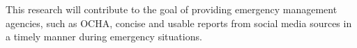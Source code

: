 \documentclass[conference]{IEEEtran}
\begin{document}
This research will contribute to the goal of providing emergency management agencies, such as OCHA, concise and usable reports from social media sources in a timely manner during emergency situations.

%
%



%
%
\end{document}
